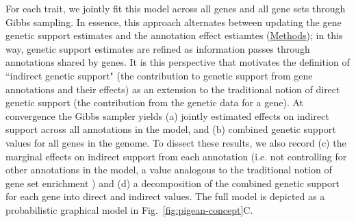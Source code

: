\documentclass[sn-nature,lineno]{sn-jnl}%
\theoremstyle{thmstyleone}%
\theoremstyle{thmstyletwo}%
\theoremstyle{thmstylethree}%
\begin{document}
For each trait, we jointly fit this model across all genes and all gene sets through Gibbs sampling. In essence, this approach alternates between updating the gene genetic support estimates and the annotation effect estiamtes (\hyperlink{pigeanpior}{Methods}); in this way, genetic support estimates are refined as information passes through annotations shared by genes. It is this perspective that motivates the definition of ``indirect genetic support" (the contribution to genetic support from gene annotations and their effects) as an extension to the traditional notion of direct genetic support (the contribution from the genetic data for a gene).  At convergence the Gibbs sampler yields (a) jointly estimated effects on indirect support across all annotations in the model, and (b) combined genetic support values for all genes in the genome. To dissect these results, we also record (c) the marginal effects on indirect support from each annotation (i.e. not controlling for other annotations in the model, a value analogous to the traditional notion of gene set enrichment \cite{?}) and (d) a decomposition of the combined genetic support for each gene into direct and indirect values. The full model is depicted as a probabilistic graphical model in Fig.~\ref{fig:pigean-concept}C. 


\newpage
\end{document}
